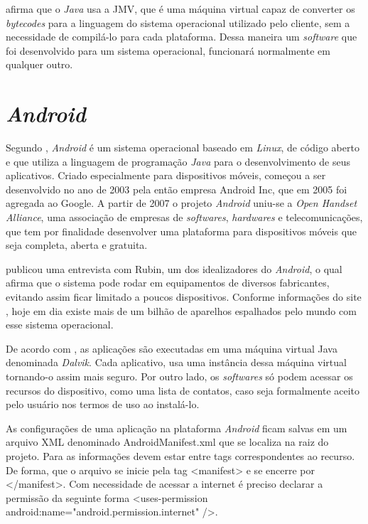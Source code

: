 	\par {} afirma que o \textit{Java} usa a JMV, que é
uma máquina virtual capaz de converter os \textit{bytecodes} para a linguagem
do sistema operacional utilizado pelo cliente, sem a necessidade de compilá-lo
para cada plataforma. Dessa maneira um \textit{software} que foi desenvolvido
para um sistema operacional, funcionará normalmente em qualquer outro.

\section{\textit{Android}}

	\par Segundo , \textit{Android} é um sistema
operacional baseado em \textit{Linux}, de código aberto e que utiliza a
linguagem de programação \textit{Java} para o desenvolvimento de seus
aplicativos. Criado especialmente para dispositivos móveis, começou a
ser desenvolvido no ano de 2003 pela então empresa Android Inc, que em 2005 foi
agregada ao Google. A partir de 2007 o projeto \textit{Android} uniu-se a
\textit{Open Handset Alliance}, uma associação de empresas de
\textit{softwares}, \textit{hardwares} e telecomunicações, que tem por
finalidade desenvolver uma plataforma para dispositivos móveis que seja
completa, aberta e gratuita.

	\par {} publicou uma entrevista com Rubin, um dos
idealizadores do \textit{Android}, o qual afirma que o sistema pode rodar em
equipamentos de diversos fabricantes, evitando assim ficar limitado a poucos
dispositivos. Conforme informações do site , hoje em dia
existe mais de um bilhão de aparelhos espalhados pelo mundo com esse sistema
operacional.

	\par De acordo com , as aplicações são executadas em
uma máquina virtual Java denominada \textit{Dalvik}. Cada aplicativo, usa uma
instância dessa máquina virtual tornando-o assim mais seguro. Por outro lado, os
\textit{softwares} só podem acessar os recursos do dispositivo, como uma
lista de contatos, caso seja formalmente aceito pelo usuário nos termos de uso
ao instalá-lo.

	\par As configurações de uma aplicação na plataforma \textit{Android} ficam
salvas em um arquivo XML denominado AndroidManifest.xml que se localiza na raiz
do projeto. Para  as informações devem estar entre tags
correspondentes ao recurso. De forma, que o arquivo se inicie pela tag
<manifest> e se encerre por </manifest>. Com necessidade de acessar a internet
é preciso declarar a permissão da seguinte forma <uses-permission
android:name="android.permission.internet" />.

